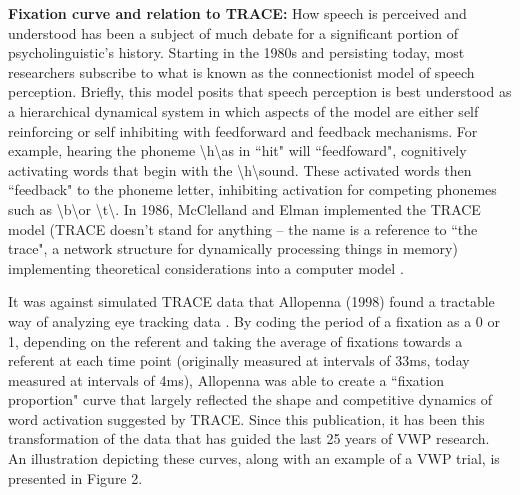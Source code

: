 \documentclass{article}
\begin{document}

\textbf{Fixation curve and relation to TRACE: } How speech is perceived and understood has been a subject of much debate for a significant portion of psycholinguistic's history. Starting in the 1980s and persisting today, most researchers subscribe to what is known as the connectionist model of speech perception. Briefly, this model posits that speech perception is best understood as a hierarchical dynamical system in which aspects of the model are either self reinforcing or self inhibiting with feedforward and feedback mechanisms. For example, hearing the phoneme \textbackslash h\textbackslash as in ``hit" will ``feedfoward", cognitively activating words that begin with the \textbackslash h\textbackslash sound. These activated words then ``feedback" to the phoneme letter, inhibiting activation for competing phonemes such as \textbackslash b\textbackslash or \textbackslash t\textbackslash. In 1986, McClelland and Elman implemented the TRACE model (TRACE doesn't stand for anything -- the name is a reference to ``the trace", a network structure for dynamically processing things in memory) implementing theoretical considerations into a computer model \cite{elman1985speech}.

It was against simulated TRACE data that Allopenna (1998) found a tractable way of analyzing eye tracking data \cite{allopenna1998tracking}. By coding the period of a fixation as a 0 or 1, depending on the referent and taking the average of fixations towards a referent at each time point (originally measured at intervals of 33ms, today  measured at intervals of 4ms), Allopenna was able to create a ``fixation proportion" curve that largely reflected the shape and competitive dynamics of word activation suggested by TRACE. Since this publication, it has been this transformation of the data that has guided the last 25 years of VWP research. An illustration depicting these curves, along with an example of a VWP trial, is presented in Figure 2.

\end{document}
